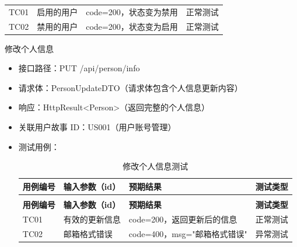 \begin{levellist}
\begin{levellist}
\begin{itemize}
\begin{longtable}{>{\centering\arraybackslash}m{2cm} >{\centering\arraybackslash}m{4cm} >{\centering\arraybackslash}m{5cm} >{\centering\arraybackslash}m{2cm}}
                      \bottomrule
                      \endfoot

                      TC01          & 启用的用户             & code=200，状态变为禁用 & 正常测试          \\
                      TC02          & 禁用的用户             & code=200，状态变为启用 & 正常测试          \\
                  \end{longtable}
        \end{itemize}

        \item 修改个人信息
        \begin{itemize}
            \item 接口路径：PUT /api/person/info
            \item 请求体：PersonUpdateDTO（请求体包含个人信息更新内容）
            \item 响应：HttpResult<Person>（返回完整的个人信息）
            \item 关联用户故事 ID：US001（用户账号管理）
            \item 测试用例：
                  \begin{longtable}{>{\centering\arraybackslash}m{1.7cm} >{\centering\arraybackslash}m{4cm} >{\centering\arraybackslash}m{5.5cm} >{\centering\arraybackslash}m{1.8cm}}

                      \caption{修改个人信息测试} \label{tab:training}                                   \\

                      \toprule
                      \textbf{用例编号} & \textbf{输入参数（id）} & \textbf{预期结果}         & \textbf{测试类型} \\
                      \midrule
                      \endfirsthead

                      \multicolumn{4}{c}{{\tablename\ \thetable{} 续表}}                          \\
                      \toprule
                      \textbf{用例编号} & \textbf{输入参数（id）} & \textbf{预期结果}         & \textbf{测试类型} \\
                      \midrule
                      \endhead

                      \bottomrule
                      \endfoot

                      TC01          & 有效的更新信息           & code=200，返回更新后的信息     & 正常测试          \\
                      TC02          & 邮箱格式错误            & code=400，msg="邮箱格式错误" & 异常测试          \\
                  \end{longtable}
        \end{itemize}


\end{levellist}
\end{levellist}
